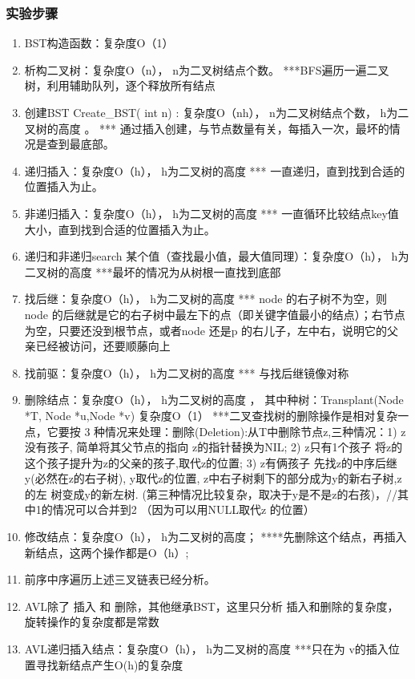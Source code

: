 \subsubsection{实验步骤}
\begin{enumerate}
\item BST构造函数：复杂度O（1）
\item 析构二叉树：复杂度O（n）， n为二叉树结点个数。      ***BFS遍历一遍二叉树，利用辅助队列，逐个释放所有结点
\item 创建BST  Create\_BST( int n) : 复杂度O（nh）， n为二叉树结点个数， h为二叉树的高度 。  *** 通过插入创建，与节点数量有关，每插入一次，最坏的情况是查到最底部。
\item 递归插入：复杂度O（h）， h为二叉树的高度      *** 一直递归，直到找到合适的位置插入为止。
\item 非递归插入：复杂度O（h）， h为二叉树的高度      *** 一直循环比较结点key值大小，直到找到合适的位置插入为止。
\item 递归和非递归search 某个值（查找最小值，最大值同理）：复杂度O（h）， h为二叉树的高度  ***最坏的情况为从树根一直找到底部
\item  找后继：复杂度O（h）， h为二叉树的高度      *** node 的右子树不为空，则 node 的后继就是它的右子树中最左下的点（即关键字值最小的结点）；右节点为空，只要还没到根节点，或者node 还是p 的右儿子，左中右，说明它的父亲已经被访问，还要顺藤向上
\item  找前驱：复杂度O（h）， h为二叉树的高度      ***  与找后继镜像对称
\item  删除结点：复杂度O（h）， h为二叉树的高度 ， 其中种树：Transplant(Node *T, Node *u,Node *v) 复杂度O（1）   ***二叉查找树的删除操作是相对复杂一点，它要按 3 种情况来处理：删除(Deletion):从T中删除节点z,三种情况：1) z没有孩子, 简单将其父节点的指向 z的指针替换为NIL;
2) z只有1个孩子 将z的这个孩子提升为z的父亲的孩子,取代z的位置;
3) z有俩孩子 先找z的中序后继y(必然在z的右子树), y取代z的位置, z中右子树剩下的部分成为y的新右子树,z的左
   树变成y的新左树. (第三种情况比较复杂，取决于y是不是z的右孩)，//其中1的情况可以合并到2 （因为可以用NULL取代z 的位置）
\item 修改结点：复杂度O（h）， h为二叉树的高度；  ****先删除这个结点，再插入新结点，这两个操作都是O（h）;
\item  前序中序遍历上述三叉链表已经分析。
\item AVL除了 插入 和 删除，其他继承BST，这里只分析 插入和删除的复杂度，旋转操作的复杂度都是常数
\item  AVL递归插入结点：复杂度O（h）， h为二叉树的高度      ***只在为 v的插入位置寻找新结点产生O(h)的复杂度

\end{enumerate}
